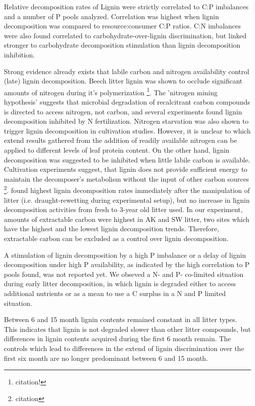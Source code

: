 \documentclass[authoryear,preprint,review,12pt]{elsarticle}
\begin{document}
Relative decomposition rates of Lignin were strictly correlated to C:P imbalances and a number of P pools analyzed. Correlation was highest when lignin decomposition was compared to resource:consumer C:P ratios. C:N imbalances were also found correlated to carbohydrate-over-lignin discrimination, but linked stronger to carbohydrate decomposition stimulation than lignin decomposition inhibition.

Strong evidence already exists that labile carbon and nitrogen availability control (late) lignin decomposition. Beech litter lignin was shown to occlude significant amounts of nitrogen during it's polymerization \footnote{citation!}. The 'nitrogen mining hypothesis' \citep{Craine2007} suggests that microbial degradation of recalcitrant carbon compounds is directed to access nitrogen, not carbon, and several experiments found lignin decomposition inhibited by N fertilization. Nitrogen starvation was also shown to trigger lignin decomposition in cultivation studies.  However, it is unclear to which extend results gathered from the addition of readily available nitrogen can be applied to different levels of leaf protein content. On the other hand, lignin decomposition was suggested to be inhibited when little labile carbon is available. Cultivation experiments suggest, that lignin does not provide sufficient energy to maintain the decomposer's metabolism without the input of other carbon sources \footnote{citation}. \cite{Klotzbucher2011} found highest lignin decomposition rates immediately after the manipulation of litter (i.e. draught-rewetting during experimental setup), but no increase in lignin decomposition activities from fresh to 3-year old litter used. In our experiment, amounts of extractable carbon were highest in AK and SW litter, two sites which have the highest and the lowest lignin decomposition trends. Therefore, extractable carbon can be excluded as a control over lignin decomposition. 

A stimulation of lignin decomposition by a high P imbalance or a delay of lignin decomposition under high P availability, as indicated by the high correlation to P pools found, was not reported yet. We obseved a N- and P- co-limited situation during early litter decomposition, in which lignin is degraded either to access additional nutrients or as a mean to use a C surplus in a N and P limited situation.  

Between 6 and 15 month lignin contents remained constant in all litter types. This indicates that lignin is not degraded slower than other litter compounds, but differences in lignin contents acquired during the first 6 month remain. The controls which lead to differences in the extend of lignin discrimination over the first six month are no longer predominant between 6 and 15 month. 
\end{document}
